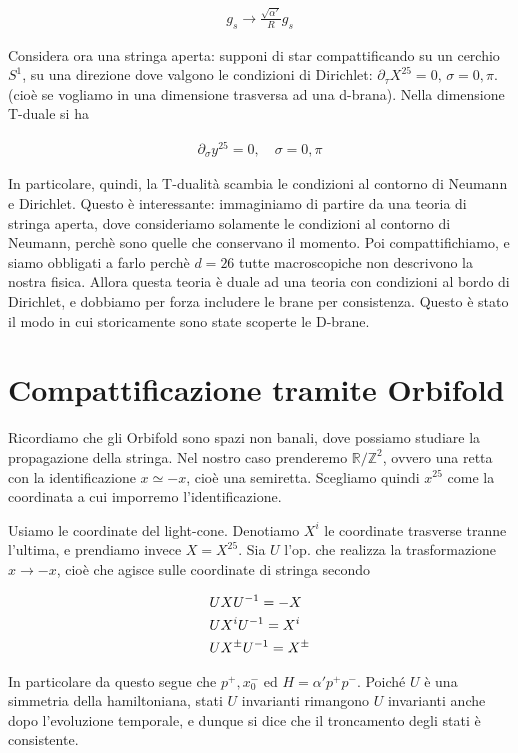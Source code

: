 \documentclass{report}
\begin{document}
\begin{align}
    g_s \to \frac{\sqrt{\alpha'}}{R}g_s
\end{align}

Considera ora una stringa aperta: supponi di star compattificando su un cerchio \(S^1\), su una direzione dove valgono le condizioni di Dirichlet: \(\partial_\tau X^{25} =0, \, \sigma = 0, \pi\). (cioè se vogliamo in una dimensione trasversa ad una d-brana). Nella dimensione T-duale si ha 

\begin{align}
    \partial_\sigma y^{25} = 0, \quad \sigma = 0, \pi
\end{align}

In particolare, quindi, la T-dualità scambia le condizioni al contorno di Neumann e Dirichlet. Questo è interessante: immaginiamo di partire da una teoria di stringa aperta, dove consideriamo solamente le condizioni al contorno di Neumann, perchè sono quelle che conservano il momento. Poi compattifichiamo, e siamo obbligati a farlo perchè \(d=26\) tutte macroscopiche non descrivono la nostra fisica. Allora questa teoria è duale ad una teoria con condizioni al bordo di Dirichlet, e dobbiamo per forza includere le brane per consistenza. Questo è stato il modo in cui storicamente sono state scoperte le D-brane. 

\section{Compattificazione tramite Orbifold}

Ricordiamo che gli Orbifold sono spazi non banali, dove possiamo studiare la propagazione della stringa. Nel nostro caso prenderemo \(\mathbb{R}/\mathbb{Z}^2\), ovvero una retta con la identificazione \(x \simeq -x\), cioè una semiretta. Scegliamo quindi \(x^{25}\) come la coordinata a cui imporremo l'identificazione. 

Usiamo le coordinate del light-cone. Denotiamo \(X^i\) le coordinate trasverse tranne l'ultima, e prendiamo invece \(X = X^{25}\). Sia \(U\) l'op. che realizza la trasformazione \(x \to -x\), cioè che agisce sulle coordinate di stringa secondo 

\begin{align}
    &U X U^{-1} = -X \notag \\
    &U X^i U^{-1} = X^i \notag \\
    &U X^\pm U^{-1} = X^\pm
\end{align}

In particolare da questo segue che \(p^+, x_0^-\) ed \(H = \alpha' p^+ p^-\). Poiché \(U\) è una simmetria della hamiltoniana, stati \(U\) invarianti rimangono \(U\) invarianti anche dopo l'evoluzione temporale, e dunque si dice che il troncamento degli stati è consistente. 
\end{document}
